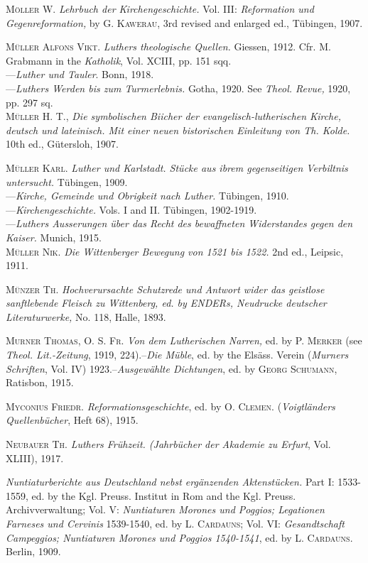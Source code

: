 \textsc{Möller W.} \textit{Lehrbuch der Kirchengeschichte.} Vol. III: \textit{Reformation und
Gegenreformation,} by \textsc{G. Kawerau}, 3rd revised and enlarged ed.,
Tübingen, 1907.

\textsc{Müller Alfons Vikt.} \textit{Luthers theologische Quellen.} Giessen, 1912. Cfr.
M. Grabmann in the \textit{Katholik}, Vol. XCIII, pp. 151 sqq. \\
---\textit{Luther und Tauler}. Bonn, 1918. \\
---\textit{Luthers Werden bis zum Turmerlebnis.} Gotha, 1920. See \textit{Theol. Revue,}
1920, pp. 297 sq. \\

\textsc{Müller H. T.}, \textit{Die symbolischen Biicher der evangelisch-lutherischen Kirche,
deutsch und lateinisch. Mit einer neuen bistorischen Einleitung von Th.
Kolde.} 10th ed., Gütersloh, 1907.

\textsc{Müller Karl.} \textit{Luther und Karlstadt. Stücke aus ibrem gegenseitigen Verbiltnis
untersucht.} Tübingen, 1909. \\
---\textit{Kirche, Gemeinde und Obrigkeit nach Luther.} Tübingen, 1910. \\
---\textit{Kirchengeschichte.} Vols. I and II. Tübingen, 1902-1919. \\
---\textit{Luthers Ausserungen über das Recht des bewaffneten Widerstandes
gegen den Kaiser.} Munich, 1915. \\

\textsc{Müller Nik.} \textit{Die Wittenberger Bewegung von 1521 bis 1522.} 2nd ed.,
Leipsic, 1911.

\textsc{Münzer Th.} \textit{Hochverursachte Schutzrede und Antwort wider das geistlose
sanftlebende Fleisch zu Wittenberg, ed. by ENDERs, Neudrucke deutscher
Literaturwerke,} No. 118, Halle, 1893.

\textsc{Murner Thomas, O. S. Fr.} \textit{Von dem Lutherischen Narren,} ed. by \textsc{P. Merker}
(see \textit{Theol. Lit.-Zeitung}, 1919, 224).--\textit{Die Müble}, ed. by the Elsäss. Verein
(\textit{Murners Schriften}, Vol. IV) 1923.--\textit{Ausgewählte Dichtungen}, ed. by
\textsc{Georg Schumann}, Ratisbon, 1915.

\textsc{Myconius Friedr.} \textit{Reformationsgeschichte}, ed. by \textsc{O. Clemen.} (\textit{Voigtländers
Quellenbücher}, Heft 68), 1915.

\textsc{Neubauer Th.} \textit{Luthers Frühzeit. (Jahrbücher der Akademie zu Erfurt}, Vol.
XLIII), 1917.

\textit{Nuntiaturberichte aus Deutschland nebst ergänzenden Aktenstücken.}
Part I: 1533-1559, ed. by the Kgl. Preuss. Institut in Rom and the Kgl. Preuss.
Archivverwaltung;
Vol. V: \textit{Nuntiaturen Morones und Poggios; Legationen Farneses und Cervinis} 1539-1540, ed. by \textsc{L. Cardauns};
Vol. VI: \textit{Gesandtschaft Campeggios; Nuntiaturen Morones und Poggios 1540-1541}, ed. by
\textsc{L. Cardauns}. Berlin, 1909.

